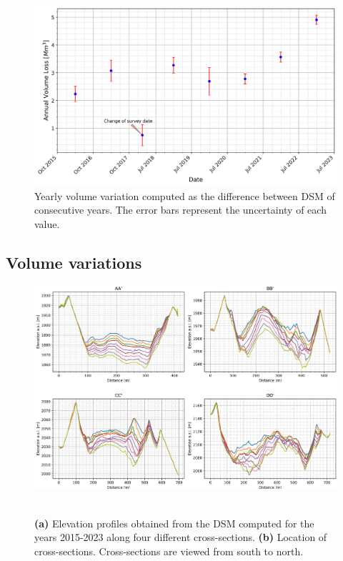 \begin{figure}[ht]
    \centering
    \includegraphics[width=1\columnwidth]{volume_loss_2015-2023.png}
    \caption{Yearly volume variation computed as the difference between DSM of consecutive years. The error bars represent the uncertainty of each value.}
    \label{fig:3:volumes}
\end{figure}

\subsection{Volume variations}\label{sec:3:res:volumes}

\begin{figure}[p]
  \centering
  \includegraphics[width=\textwidth]{profiles.png} \\
   \\
    \caption{\textbf{(a)} Elevation profiles obtained from the DSM computed for the years 2015-2023 along four different cross-sections. \textbf{(b)} Location of cross-sections. Cross-sections are viewed from south to north.}
    \label{fig:3:profiles}
\end{figure}

